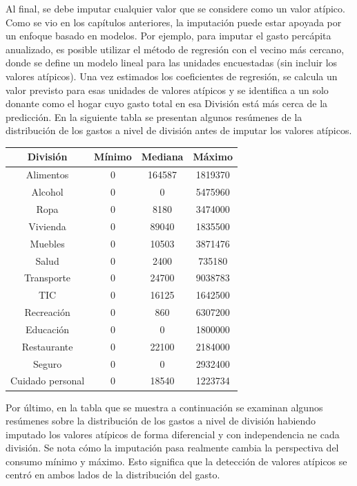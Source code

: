 \documentclass[
  12pt,
  spanish,
]{book}
\begin{document}
Al final, se debe imputar cualquier valor que se considere como un valor atípico. Como se vio en los capítulos anteriores, la imputación puede estar apoyada por un enfoque basado en modelos. Por ejemplo, para imputar el gasto percápita anualizado, es posible utilizar el método de regresión con el vecino más cercano, donde se define un modelo lineal para las unidades encuestadas (sin incluir los valores atípicos). Una vez estimados los coeficientes de regresión, se calcula un valor previsto para esas unidades de valores atípicos y se identifica a un solo donante como el hogar cuyo gasto total en esa División está más cerca de la predicción. En la siguiente tabla se presentan algunos resúmenes de la distribución de los gastos a nivel de división antes de imputar los valores atípicos.

\begin{longtable}[]{@{}cccc@{}}
\toprule
División & Mínimo & Mediana & Máximo \\
\midrule
\endhead
Alimentos & 0 & 164587 & 1819370 \\
Alcohol & 0 & 0 & 5475960 \\
Ropa & 0 & 8180 & 3474000 \\
Vivienda & 0 & 89040 & 1835500 \\
Muebles & 0 & 10503 & 3871476 \\
Salud & 0 & 2400 & 735180 \\
Transporte & 0 & 24700 & 9038783 \\
TIC & 0 & 16125 & 1642500 \\
Recreación & 0 & 860 & 6307200 \\
Educación & 0 & 0 & 1800000 \\
Restaurante & 0 & 22100 & 2184000 \\
Seguro & 0 & 0 & 2932400 \\
Cuidado personal & 0 & 18540 & 1223734 \\
\bottomrule
\end{longtable}

Por último, en la tabla que se muestra a continuación se examinan algunos resúmenes sobre la distribución de los gastos a nivel de división habiendo imputado los valores atípicos de forma diferencial y con independencia ne cada división. Se nota cómo la imputación pasa realmente cambia la perspectiva del consumo mínimo y máximo. Esto significa que la detección de valores atípicos se centró en ambos lados de la distribución del gasto.
\end{document}
